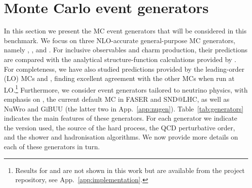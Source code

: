 \section{Monte Carlo event generators}
\label{sec:generators}

In this section we present the MC event generators that will be considered in this benchmark.
%
We focus on three NLO-accurate general-purpose MC generators, namely \sherpa, \herwig, and \powheg. 
%
For inclusive observables and charm production, their predictions are compared with the analytical structure-function calculations provided by \yadism.
%
For completeness, we have also studied predictions provided by the leading-order (LO) MCs \pythia and \mgamc, finding excellent agreement with the other MCs when run at LO.\footnote{Results for \pythia and \mgamc are not shown in this work but are available from the project repository, see App.~\ref{app:implementation}.}
%
Furthermore, we consider event generators tailored to neutrino physics, with emphasis on \genie, the current default MC in FASER and SND@LHC, as well as {\sc\small NuWro} and {\sc\small GiBUU} (the latter two in App.~\ref{app:nugen}).
%
Table~\ref{tab:generators} indicates the main features of these generators.
%
For each generator we indicate the version used, the source of the hard process, the QCD perturbative order, and the shower and hadronisation algorithms.
%
We now provide more details on each of these generators in turn.


